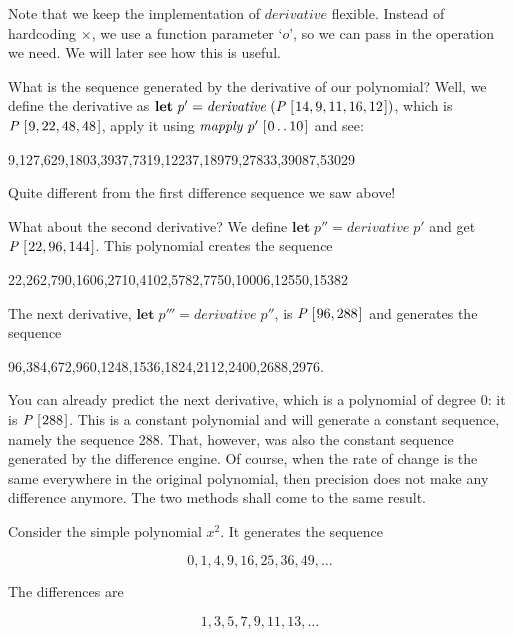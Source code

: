 \documentclass[tikz]{scrreprt}
\newcommand{\Conid}[1]{\mathit{#1}}
\newcommand{\Varid}[1]{\mathit{#1}}
\begin{document}
Note that we keep the implementation of \ensuremath{\Varid{derivative}}
flexible. Instead of hardcoding $\times$,
we use a function parameter `\ensuremath{\Varid{o}}', so we can pass in the operation
we need. We will later see how this is useful.

What is the sequence generated by the derivative of our polynomial?
Well, we define the derivative as
\ensuremath{\mathbf{let}\;\Varid{p'}\mathrel{=}\Varid{derivative}\;(\Conid{P}\;[\mskip1.5mu \mathrm{14},\mathrm{9},\mathrm{11},\mathrm{16},\mathrm{12}\mskip1.5mu])}, which is \ensuremath{\Conid{P}\;[\mskip1.5mu \mathrm{9},\mathrm{22},\mathrm{48},\mathrm{48}\mskip1.5mu]},
apply it using \ensuremath{\Varid{mapply}\;\Varid{p'}\;[\mskip1.5mu \mathrm{0}\mathinner{\ldotp\ldotp}\mathrm{10}\mskip1.5mu]} and see:

9,127,629,1803,3937,7319,12237,18979,27833,39087,53029

Quite different from the first difference sequence we saw above!

What about the second derivative? We define
\ensuremath{\mathbf{let}\;\Varid{p''}\mathrel{=}\Varid{derivative}\;\Varid{p'}} and get \ensuremath{\Conid{P}\;[\mskip1.5mu \mathrm{22},\mathrm{96},\mathrm{144}\mskip1.5mu]}.
This polynomial creates the sequence

22,262,790,1606,2710,4102,5782,7750,10006,12550,15382

The next derivative, \ensuremath{\mathbf{let}\;\Varid{p'''}\mathrel{=}\Varid{derivative}\;\Varid{p''}},
is \ensuremath{\Conid{P}\;[\mskip1.5mu \mathrm{96},\mathrm{288}\mskip1.5mu]} and generates the sequence

96,384,672,960,1248,1536,1824,2112,2400,2688,2976.

You can already predict the next derivative,
which is a polynomial of degree 0: it is \ensuremath{\Conid{P}\;[\mskip1.5mu \mathrm{288}\mskip1.5mu]}.
This is a constant polynomial and will generate a constant
sequence, namely the sequence 288. That, however,
was also the constant sequence generated by the
difference engine. Of course, when the rate of change
is the same everywhere in the original polynomial,
then precision does not make any difference anymore.
The two methods shall come to the same result.

Consider the simple polynomial $x^2$.
It generates the sequence

\[
0,1,4,9,16,25,36,49,\dots
\]

The differences are

\[
1,3,5,7,9,11,13,\dots
\]
\end{document}
